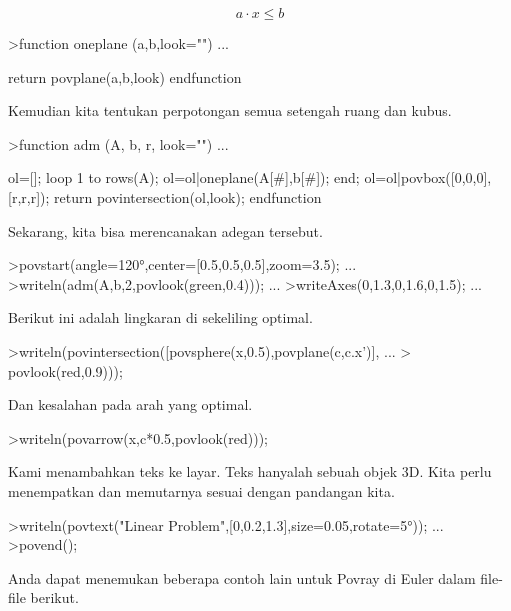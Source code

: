 \documentclass[a4paper,10pt]{article}
\begin{document}
\begin{eulernotebook}
\begin{eulercomment}
\end{eulercomment}
\begin{eulerformula}
\[
a \cdot x \le b
\]
\end{eulerformula}
\begin{eulerprompt}
>function oneplane (a,b,look="") ...
\end{eulerprompt}
\begin{eulerudf}
    return povplane(a,b,look)
  endfunction
\end{eulerudf}
\begin{eulercomment}
Kemudian kita tentukan perpotongan semua setengah ruang dan kubus.
\end{eulercomment}
\begin{eulerprompt}
>function adm (A, b, r, look="") ...
\end{eulerprompt}
\begin{eulerudf}
    ol=[];
    loop 1 to rows(A); ol=ol|oneplane(A[#],b[#]); end;
    ol=ol|povbox([0,0,0],[r,r,r]);
    return povintersection(ol,look);
  endfunction
\end{eulerudf}
\begin{eulercomment}
Sekarang, kita bisa merencanakan adegan tersebut.
\end{eulercomment}
\begin{eulerprompt}
>povstart(angle=120°,center=[0.5,0.5,0.5],zoom=3.5); ...
>writeln(adm(A,b,2,povlook(green,0.4))); ...
>writeAxes(0,1.3,0,1.6,0,1.5); ...
\end{eulerprompt}
\begin{eulercomment}
Berikut ini adalah lingkaran di sekeliling optimal.
\end{eulercomment}
\begin{eulerprompt}
>writeln(povintersection([povsphere(x,0.5),povplane(c,c.x')], ...
>  povlook(red,0.9)));
\end{eulerprompt}
\begin{eulercomment}
Dan kesalahan pada arah yang optimal.
\end{eulercomment}
\begin{eulerprompt}
>writeln(povarrow(x,c*0.5,povlook(red)));
\end{eulerprompt}
\begin{eulercomment}
Kami menambahkan teks ke layar. Teks hanyalah sebuah objek 3D. Kita
perlu menempatkan dan memutarnya sesuai dengan pandangan kita.
\end{eulercomment}
\begin{eulerprompt}
>writeln(povtext("Linear Problem",[0,0.2,1.3],size=0.05,rotate=5°)); ...
>povend();
\end{eulerprompt}
\begin{eulercomment}
Anda dapat menemukan beberapa contoh lain untuk Povray di Euler dalam
file-file berikut.


\end{eulercomment}
\end{eulernotebook}
\end{document}
